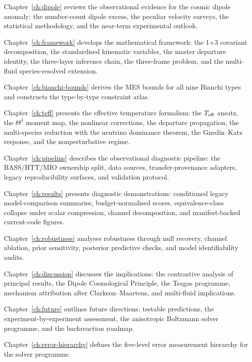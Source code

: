 Chapter~\ref{ch:dipole} reviews the observational evidence
for the cosmic dipole anomaly: the number-count dipole
excess, the peculiar velocity surveys, the statistical
methodology, and the near-term experimental outlook.

Chapter~\ref{ch:framework} develops the mathematical
framework: the 1+3 covariant decomposition, the standardised
kinematic variables, the master departure identity, the
three-layer inference chain, the three-frame problem, and the
multi-fluid species-resolved extension.

Chapter~\ref{ch:bianchi-bounds} derives the MES bounds for
all nine Bianchi types and constructs the type-by-type
constraint atlas.

Chapter~\ref{ch:teff} presents the effective temperature
formalism: the $T_{\mathrm{eff}}$ ansatz, the $\Theta^4$ moment map,
the nonlinear corrections, the departure propagation, the
multi-species reduction with the neutrino dominance theorem,
the Gnedin--Katz response, and the nonperturbative regime.

Chapter~\ref{ch:pipeline} describes the observational
diagnostic pipeline: the BASS/HTT/MIO ownership split, data
sources, transfer-provenance adapters, legacy reproducibility
surfaces, and validation protocol.

Chapter~\ref{ch:results} presents diagnostic demonstrations:
conditioned legacy model-comparison summaries, budget-normalised
scores, equivalence-class collapse under scalar compression,
channel decomposition, and manifest-backed current-code figures.

Chapter~\ref{ch:robustness} analyses robustness through
null recovery, channel ablation, prior sensitivity,
posterior predictive checks, and model identifiability audits.

Chapter~\ref{ch:discussion} discusses the implications:
the contrastive analysis of principal results, the Dipole
Cosmological Principle, the Tsagas programme, mechanism
attribution after Clarkson--Maartens, and multi-fluid
implications.

Chapter~\ref{ch:future} outlines future directions: testable
predictions, the experiment-by-experiment assessment, the
anisotropic Boltzmann solver programme, and the backreaction
roadmap.

Chapter~\ref{ch:error-hierarchy} defines the five-level error
measurement hierarchy for the solver programme.
